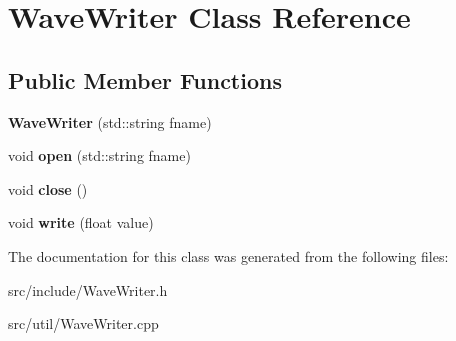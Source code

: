 \hypertarget{classWaveWriter}{\section{Wave\-Writer Class Reference}
\label{classWaveWriter}
}
\subsection*{Public Member Functions}
\begin{DoxyCompactItemize}
\item 
\hypertarget{classWaveWriter_ab56ef6702c7c651004329fe76893b2f7}{{\bfseries Wave\-Writer} (std\-::string fname)}\label{classWaveWriter_ab56ef6702c7c651004329fe76893b2f7}

\item 
\hypertarget{classWaveWriter_a369569d5d2068f497731936073ad4ad1}{void {\bfseries open} (std\-::string fname)}\label{classWaveWriter_a369569d5d2068f497731936073ad4ad1}

\item 
\hypertarget{classWaveWriter_ae50259472af637a4083399953440ee0e}{void {\bfseries close} ()}\label{classWaveWriter_ae50259472af637a4083399953440ee0e}

\item 
\hypertarget{classWaveWriter_a267d0704f57004f0adf079096d3dc460}{void {\bfseries write} (float value)}\label{classWaveWriter_a267d0704f57004f0adf079096d3dc460}

\end{DoxyCompactItemize}


The documentation for this class was generated from the following files\-:\begin{DoxyCompactItemize}
\item 
src/include/Wave\-Writer.\-h\item 
src/util/Wave\-Writer.\-cpp\end{DoxyCompactItemize}
